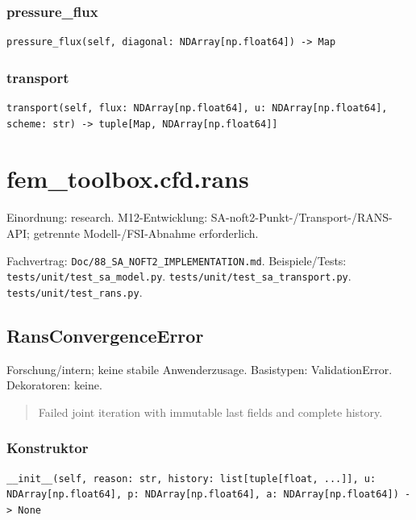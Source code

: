 \subsubsection*{pressure\_flux}
\begin{lstlisting}
pressure_flux(self, diagonal: NDArray[np.float64]) -> Map
\end{lstlisting}
\subsubsection*{transport}
\begin{lstlisting}
transport(self, flux: NDArray[np.float64], u: NDArray[np.float64], scheme: str) -> tuple[Map, NDArray[np.float64]]
\end{lstlisting}
\section{fem\_toolbox.cfd.rans}
Einordnung: research. M12-Entwicklung: SA-noft2-Punkt-/Transport-/RANS-API; getrennte Modell-/FSI-Abnahme erforderlich.
\par Fachvertrag: \nolinkurl{Doc/88_SA_NOFT2_IMPLEMENTATION.md}. Beispiele/Tests:
\nolinkurl{tests/unit/test_sa_model.py}.
\nolinkurl{tests/unit/test_sa_transport.py}.
\nolinkurl{tests/unit/test_rans.py}.
\subsection{RansConvergenceError}
Forschung/intern; keine stabile Anwenderzusage.
Basistypen: ValidationError. Dekoratoren: keine.
\begin{quote}
Failed joint iteration with immutable last fields and complete history.
\end{quote}
\subsubsection*{Konstruktor}
\begin{lstlisting}
__init__(self, reason: str, history: list[tuple[float, ...]], u: NDArray[np.float64], p: NDArray[np.float64], a: NDArray[np.float64]) -> None
\end{lstlisting}
